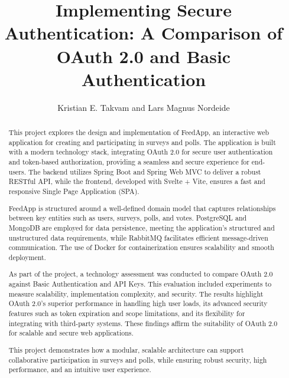 \documentclass[11pt]{article}
\begin{document}
\title{Implementing Secure Authentication: A Comparison of OAuth 2.0 and Basic Authentication}

\author{Kristian E. Takvam and Lars Magnus Nordeide}

\maketitle

\begin{abstract}
This project explores the design and implementation of FeedApp, an interactive web application for creating and participating in surveys and polls. The application is built with a modern technology stack, integrating OAuth 2.0 for secure user authentication and token-based authorization, providing a seamless and secure experience for end-users. The backend utilizes Spring Boot and Spring Web MVC to deliver a robust RESTful API, while the frontend, developed with Svelte + Vite, ensures a fast and responsive Single Page Application (SPA).

FeedApp is structured around a well-defined domain model that captures relationships between key entities such as users, surveys, polls, and votes. PostgreSQL and MongoDB are employed for data persistence, meeting the application's structured and unstructured data requirements, while RabbitMQ facilitates efficient message-driven communication. The use of Docker for containerization ensures scalability and smooth deployment.

As part of the project, a technology assessment was conducted to compare OAuth 2.0 against Basic Authentication and API Keys. This evaluation included experiments to measure scalability, implementation complexity, and security. The results highlight OAuth 2.0's superior performance in handling high user loads, its advanced security features such as token expiration and scope limitations, and its flexibility for integrating with third-party systems. These findings affirm the suitability of OAuth 2.0 for scalable and secure web applications.

This project demonstrates how a modular, scalable architecture can support collaborative participation in surveys and polls, while ensuring robust security, high performance, and an intuitive user experience.

\end{abstract}

%














{}
\end{document}
